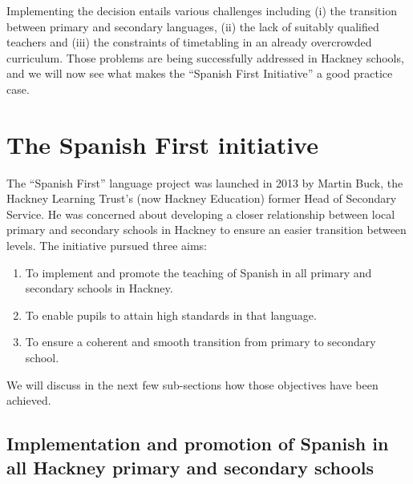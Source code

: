 \documentclass[output=paper]{langscibook}
\begin{document}
Implementing the decision entails various challenges including (i) the transition between primary and secondary languages, (ii) the lack of suitably qualified teachers and (iii) the constraints of timetabling in an already overcrowded curriculum. Those problems are being successfully addressed in Hackney schools, and we will now see what makes the “Spanish First Initiative” a good practice case.

\section{The Spanish First initiative}

The ``Spanish First'' language project was launched in 2013 by Martin Buck, the Hackney Learning Trust’s (now Hackney Education) former Head of Secondary Service. He was concerned about developing a closer relationship between local primary and secondary schools in Hackney to ensure an easier transition between levels. The initiative pursued three aims:

\begin{enumerate}
\item To implement and promote the teaching of Spanish in all primary and secondary schools in Hackney.
\item To enable pupils to attain high standards in that language.
\item To ensure a coherent and smooth transition from primary to secondary school.
\end{enumerate}

We will discuss in the next few sub-sections how those objectives have been achieved.

\subsection{Implementation and promotion of Spanish in all Hackney primary and secondary schools}
\end{document}
